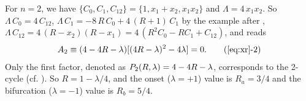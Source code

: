 \documentclass{ws-ijbc}
\begin{document}
For $n = 2$, we have %
$\{C_0, C_1, C_{12}\}
  = \{1,  x_1 + x_2, x_1 x_2 \}$
and
$\Lambda = 4 \, x_1 x_2$.
So
$\Lambda \, C_0 = 4 \, C_{12}$,
$\Lambda \, C_1 %
  = -8 \, R \, C_0 + 4 \, (R + 1) \, C_1$
by the example after ,
$\Lambda \, C_{12}
= 4 \, (R - x_2) (R - x_1) = 4 \, (R^2C_0-RC_1+C_{12})$,
and  reads
%
%
%
%
%
%
\begin{align}
A_2 \equiv (4 - 4R - \lambda) [(4 R-\lambda)^2 - 4 \lambda] = 0.
  \tag{\ref{eq:xr}-2}
\label{eq:xr2}
\end{align}
%
%
%
Only the first factor, denoted as $P_2(R, \lambda) = 4-4R -\lambda$,
  corresponds to the 2-cycle  (cf. ).
So $R = 1 - \lambda/4$,
and the onset ($\lambda = +1$) value is $R_a = 3/4$ %
and the bifurcation ($\lambda = -1$) value is $R_b = 5/4$. %
%
\end{document}

